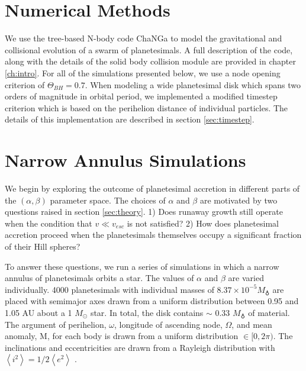 \section{Numerical Methods}\label{sec:methods}

We use the tree-based N-body code {\sc ChaNGa} to model the gravitational and collisional evolution of a swarm of planetesimals. A full description of the code, along with the details of the solid body collision module are provided in chapter \ref{ch:intro}. For all of the simulations presented below, we use a node opening criterion of $\Theta_{BH} = 0.7$. When modeling a wide planetesimal disk which spans two orders of magnitude in orbital period, we implemented a modified timestep criterion which is based on the perihelion distance of individual particles. The details of this implementation are described in section \ref{sec:timestep}.

\section{Narrow Annulus Simulations}\label{sec:narrow}

We begin by 
exploring the outcome of planetesimal accretion in different parts of the $\left( \alpha, \beta \right)$
parameter space. The choices of $\alpha$ and $\beta$ are motivated by two questions raised in section \ref{sec:theory}. 1) Does
runaway growth still operate when the condition that $v \ll v_{esc}$
is not satisfied? 2) How does planetesimal accretion proceed when the planetesimals themselves occupy a significant fraction of 
their Hill spheres?

To answer these questions, we run a series of simulations in which a
narrow annulus of planetesimals orbits a star. The values of $\alpha$
and $\beta$ are varied individually. 4000 planetesimals with
individual masses of $8.37 \times 10^{-5} M_{\earth}$ are placed with semimajor
axes drawn from a uniform distribution between 0.95 and 1.05 AU about a 1 $M_{\odot}$
star. In total, the disk contains $\sim$ 0.33 $M_{\earth}$ of material. The argument of perihelion, $\omega$, longitude of ascending node,
$\Omega$, and mean anomaly, M, for each body is drawn from a uniform
distribution $\in [0, 2 \pi)$. The inclinations and eccentricities are drawn
from a Rayleigh distribution with
$\left< i^{2} \right> = 1/2 \left< e^{2} \right>$ \cite{ida93a}.

